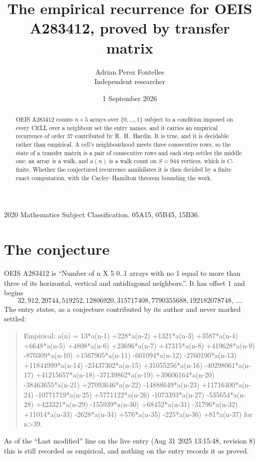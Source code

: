\documentclass[11pt,a4paper]{article}
\title{The empirical recurrence for OEIS A283412, proved by transfer matrix}
\author{Adrian Perez Fontelles\\ \small Independent researcher}
\date{1 September 2026}
\theoremstyle{plain}
\theoremstyle{definition}
\begin{document}
\maketitle

\begin{abstract}
OEIS A283412 counts $n\times5$ arrays over $\{0,\dots,1\}$ subject to a condition imposed on
every CELL over a neighbour set the entry names, and it carries an empirical recurrence of
order $37$ contributed by R.~H.~Hardin. It is true, and it is decidable rather than
empirical. A cell's neighbourhood meets three consecutive rows, so the state of a transfer
matrix is a pair of consecutive rows and each step settles the middle one; an array is a
walk, and $a(n)$ is a walk count on $S=944$ vertices, which is $C$-finite. Whether the
conjectured recurrence annihilates it is then decided by a finite exact computation, with the
Cayley--Hamilton theorem bounding the work.
\end{abstract}

\noindent\small 2020 Mathematics Subject Classification. 05A15, 05B45, 15B36.\normalsize

\section{The conjecture}

OEIS A283412 is ``Number of n X 5 0..1 arrays with no 1 equal to more than three of its horizontal, vertical and antidiagonal neighbors.''. It has offset $1$ and begins
\[
32, 912, 20744, 519252, 12806920, 315717408, 7790355688, 192182078748,\ \dots
\]
The entry states, as a conjecture contributed by its author and never marked settled:
\begin{quote}
Empirical: a(n) = 13*a(n-1) +228*a(n-2) +1321*a(n-3) +3587*a(n-4) +6648*a(n-5) +4808*a(n-6) +23696*a(n-7) +47315*a(n-8) +419628*a(n-9) -870309*a(n-10) +1567905*a(n-11) -601094*a(n-12) -2760190*a(n-13) +11844999*a(n-14) -23437302*a(n-15) +31055256*a(n-16) -40298061*a(n-17) +41215657*a(n-18) -37139862*a(n-19) +39606164*a(n-20) -38463655*a(n-21) +27093646*a(n-22) -14888649*a(n-23) +11716400*a(n-24) -10771719*a(n-25) +5771122*a(n-26) -1073393*a(n-27) -535654*a(n-28) +423321*a(n-29) -155939*a(n-30) +68452*a(n-31) -31796*a(n-32) +11014*a(n-33) -2628*a(n-34) +576*a(n-35) -225*a(n-36) +81*a(n-37) for n>39.
\end{quote}
As of the ``Last modified'' line on the live entry (Aug 31 2025 13:15:48, revision 8) this is still
recorded as empirical, and nothing on the entry records it as proved.
\end{document}

